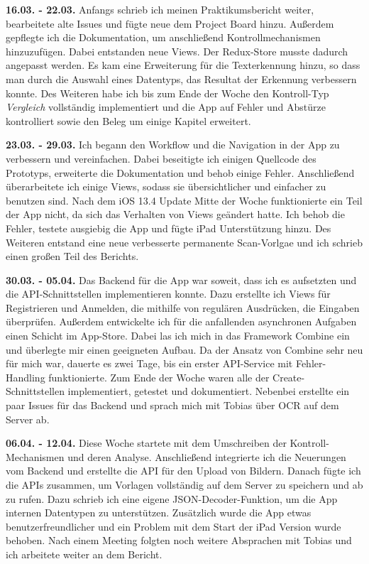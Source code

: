 \documentclass[notables, nomenclature, oneside, 150]{HSMW-Thesis}
\begin{document}
	\textbf{16.03. - 22.03.} 
	Anfangs schrieb ich meinen Praktikumsbericht weiter, bearbeitete alte Issues und fügte neue dem Project Board hinzu. Außerdem gepflegte ich die Dokumentation, um anschließend Kontrollmechanismen hinzuzufügen. Dabei entstanden neue Views. Der Redux-Store musste dadurch angepasst werden. Es kam eine Erweiterung für die Texterkennung hinzu, so dass man durch die Auswahl eines Datentyps, das Resultat der Erkennung verbessern konnte. Des Weiteren habe ich bis zum Ende der Woche den Kontroll-Typ \textit{Vergleich} vollständig implementiert und die App auf Fehler und Abstürze kontrolliert sowie den Beleg um einige Kapitel erweitert.
	
	\textbf{23.03. - 29.03.} 
	Ich begann den Workflow und die Navigation in der App zu verbessern und vereinfachen. Dabei beseitigte ich einigen Quellcode des Prototyps, erweiterte die Dokumentation und behob einige Fehler. Anschließend überarbeitete ich einige Views, sodass sie übersichtlicher und einfacher zu benutzen sind. Nach dem iOS 13.4 Update Mitte der Woche funktionierte ein Teil der App nicht, da sich das Verhalten von Views geändert hatte. Ich behob die Fehler, testete ausgiebig die App und fügte iPad Unterstützung hinzu. Des Weiteren entstand eine neue verbesserte permanente Scan-Vorlgae und ich schrieb einen großen Teil des Berichts.
	
	\textbf{30.03. - 05.04.} 
	Das Backend für die App war soweit, dass ich es aufsetzten und die API-Schnittstellen implementieren konnte. Dazu erstellte ich Views für Registrieren und Anmelden, die mithilfe von regulären Ausdrücken, die Eingaben überprüfen. Außerdem entwickelte ich für die anfallenden asynchronen Aufgaben einen Schicht im App-Store. Dabei las ich mich in das Framework Combine ein und überlegte mir einen geeigneten Aufbau. Da der Ansatz von Combine sehr neu für mich war, dauerte es zwei Tage, bis ein erster API-Service mit Fehler-Handling funktionierte. Zum Ende der Woche waren alle der Create-Schnittstellen implementiert, getestet und dokumentiert. Nebenbei erstellte ein paar Issues für das Backend und sprach mich mit Tobias über OCR auf dem Server ab.
	
	\textbf{06.04. - 12.04.}
	Diese Woche startete mit dem Umschreiben der Kontroll-Mechanismen und deren Analyse. Anschließend integrierte ich die Neuerungen vom Backend und erstellte die API für den Upload von Bildern. Danach fügte ich die APIs zusammen, um Vorlagen vollständig auf dem Server zu speichern und ab zu rufen. Dazu schrieb ich eine eigene JSON-Decoder-Funktion, um die App internen Datentypen zu unterstützen. Zusätzlich wurde die App etwas benutzerfreundlicher und ein Problem mit dem Start der iPad Version wurde behoben. Nach einem Meeting folgten noch weitere Absprachen mit Tobias und ich arbeitete weiter an dem Bericht.
	
\end{document}
